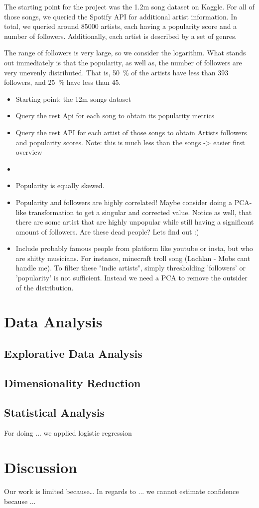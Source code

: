 \documentclass{article}
\begin{document}
The starting point for the project was the 1.2m song dataset on Kaggle. 
For all of those songs, we queried the Spotify API for additional artist information. 
In total, we queried around \num[]{85 000} artists, each having a popularity score and a number of followers. 
Additionally, each artist is described by a set of genres.

The range of followers is very large, so we consider the logarithm.
What stands out immediately is that the popularity, as well as, the number of followers are very unevenly distributed. 
That is, \SI{50}{\percent} of the artists have less than 393 followers, and \SI{25}{\percent} have less than 45. 



\begin{itemize}
  \item Starting point: the 12m songs dataset
  \item Query the rest Api for each song to obtain its popularity metrics
  \item Query the rest API for each artist of those songs to obtain Artists followers and popularity scores. Note: this is much less than the songs -> easier first overview
  \item 
  \item Popularity is equally skewed.
  \item Popularity and followers are highly correlated! Maybe consider doing a PCA-like transformation to get a singular and corrected value. Notice as well, that there are some artist that are highly unpopular while still having a significant amount of followers. Are these dead people? Lets find out :)
  \item Include probably famous people from platform like youtube or insta, but who are shitty musicians. For instance, minecraft troll song (Lachlan - Mobs cant handle me).
  To filter these "indie artists", simply thresholding 'followers' or 'popularity' is not sufficient. Instead we need a PCA to remove the outsider of the distribution.
\end{itemize}

\section{Data Analysis}

\subsection{Explorative Data Analysis}

\subsection{Dimensionality Reduction}

\subsection{Statistical Analysis}
For doing ... we applied logistic regression

\section{Discussion}
Our work is limited because\dots
In regards to ... we cannot estimate confidence because ...
\end{document}
